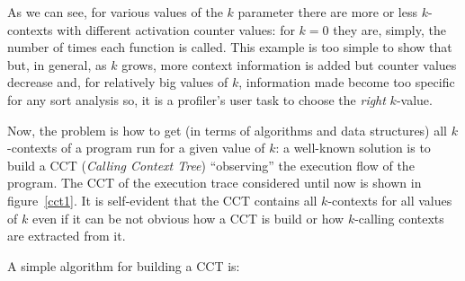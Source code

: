 \documentclass[a4paper,11pt]{report}
\begin{document}
As we can see, for various values of the $k$ parameter there are more or less $k$-contexts with different activation counter values: for $k=0$ they are, simply, the number of times each function is called. This example is too simple to show that but, in general, as $k$ grows, more context information is added but counter values decrease and, for relatively big values of $k$, information made become too specific for any sort analysis so, it is a profiler's user task to choose the \emph{right} $k$-value.

Now, the problem is how to get (in terms of algorithms and data structures) all $k$-contexts 
of a program run for a given value of $k$: a well-known solution is to build a CCT
(\emph{Calling Context Tree}) ``observing'' the execution flow of the program.
The CCT of the execution trace considered until now is shown in figure~\ref{cct1}.
It is self-evident that the CCT contains all $k$-contexts for all values of $k$ even if 
it can be not obvious how a CCT is build or how $k$-calling contexts are extracted from it.

A simple algorithm for building a CCT is:
\end{document}
